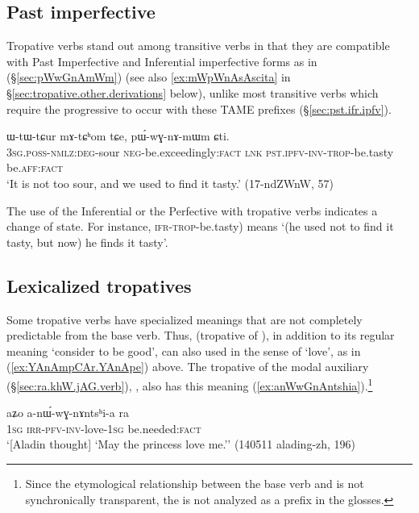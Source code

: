 \subsection{Past imperfective} \label{sec:tropative.pst.ipfv}
Tropative verbs stand out among transitive verbs in that they are compatible with Past Imperfective  and Inferential imperfective  forms as in (§\ref{sec:pWwGnAmWm}) (see also \ref{ex:mWpWnAsAscita} in §\ref{sec:tropative.other.derivations} below), unlike most transitive verbs which require the progressive  to occur with these TAME prefixes (§\ref{sec:pst.ifr.ipfv}).


 \begin{exe}
\ex \label{sec:pWwGnAmWm}
\gll ɯ-tɯ-tɕur mɤ-tɕʰom tɕe, pɯ́-wɣ-nɤ-mɯm ɕti.  \\
\textsc{3sg}.\textsc{poss}-\textsc{nmlz}:\textsc{deg}-sour \textsc{neg}-be.exceedingly:\textsc{fact} \textsc{lnk} \textsc{pst}.\textsc{ipfv}-\textsc{inv}-\textsc{trop}-be.tasty be.\textsc{aff}:\textsc{fact} \\
 \glt `It is not too sour, and we used to find it tasty.' (17-ndZWnW, 57)
\end{exe}  

The use of the Inferential or the Perfective with tropative verbs indicates a change of state. For instance,  \textsc{ifr}-\textsc{trop}-be.tasty) means `(he used not to find it tasty, but now) he finds it tasty'.
 
\subsection{Lexicalized tropatives} \label{sec:tropative.lexicalized}
Some tropative verbs have specialized meanings that are not completely predictable from the base verb. Thus,  (tropative of ), in addition to its regular meaning `consider to be good', can also used in the sense of `love', as in (\ref{ex:YAnAmpCAr.YAnApe}) above. The tropative of the modal auxiliary  (§\ref{sec:ra.khW.jAG.verb}), , also has this meaning (\ref{ex:anWwGnAntshia}).\footnote{Since the etymological relationship between the base verb   and  is not synchronically transparent, the  is not analyzed as a prefix in the glosses. }

\begin{exe}
\ex \label{ex:anWwGnAntshia}
\gll aʑo a-nɯ́-wɣ-nɤntsʰi-a ra \\
\textsc{1sg} \textsc{irr}-\textsc{pfv}-\textsc{inv}-love-\textsc{1sg} be.needed:\textsc{fact} \\
\glt `[Aladin thought] `May the princess love me.'' (140511 alading-zh, 196)
\end{exe}

